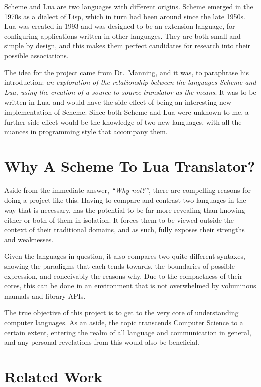 Scheme and Lua are two languages with different origins. Scheme emerged in the
1970s as a dialect of Lisp, which in turn had been around since the late 1950s.
Lua was created in 1993 and was designed to be an extension language, for
configuring applications written in other languages. They are both small and
simple by design, and this makes them perfect candidates for research into their
possible associations.

The idea for the project came from Dr.\ Manning, and it was, to paraphrase his
introduction: {\em an exploration of the relationship between the languages
Scheme and Lua, using the creation of a source-to-source translator as the
means}. It was to be written in Lua, and would have the side-effect of being an
interesting new implementation of Scheme. Since both Scheme and Lua were unknown
to me, a further side-effect would be the knowledge of two new languages, with
all the nuances in programming style that accompany them.


\section{Why A Scheme To Lua Translator?}

Aside from the immediate answer, \emph{``Why not?''}, there are compelling
reasons for doing a project like this. Having to compare and contrast two
languages in the way that is necessary, has the potential to be far more
revealing than knowing either or both of them in isolation. It forces them to be
viewed outside the context of their traditional domains, and as such, fully
exposes their strengths and weaknesses.

Given the languages in question, it also compares two quite different syntaxes,
showing the paradigms that each tends towards, the boundaries of possible
expression, and conceivably the reasons why. Due to the compactness of their
cores, this can be done in an environment that is not overwhelmed by voluminous
manuals and library APIs.

The true objective of this project is to get to the very core of understanding
computer languages. As an aside, the topic transcends Computer Science to a
certain extent, entering the realm of all language and communication in general,
and any personal revelations from this would also be beneficial.

\section{Related Work}

